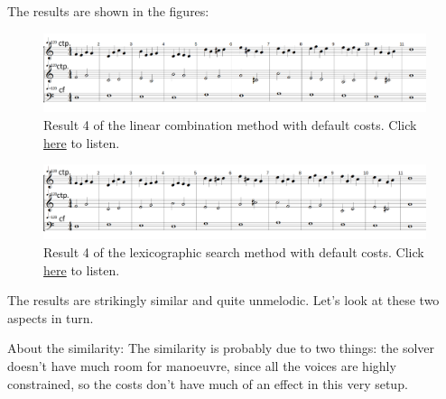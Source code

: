 The results are shown in the figures:

\begin{figure}[h]
    \centering
    \includegraphics[width=1\textwidth]{Images/Experiments/linear-combination-2sp.png}
    \caption{Result 4 of the linear combination method with default costs. Click \href{https://youtu.be/_VrM76hp1v8}{here} to listen.}
    \label{fig:combili-2sp}
\end{figure}

\begin{figure}[h]
    \centering
    \includegraphics[width=1\textwidth]{Images/Experiments/basic-lexico-2sp.png}
    \caption{Result 4 of the lexicographic search method with default costs. Click \href{https://youtu.be/msY1LOGw3v8}{here} to listen.}
    \label{fig:lexico-2sp}
\end{figure}

The results are strikingly similar and quite unmelodic. Let's look at these two aspects in turn.

About the similarity: The similarity is probably due to two things: the solver doesn't have much room for manoeuvre, since all the voices are highly constrained, so the costs don't have much of an effect in this very setup. 

